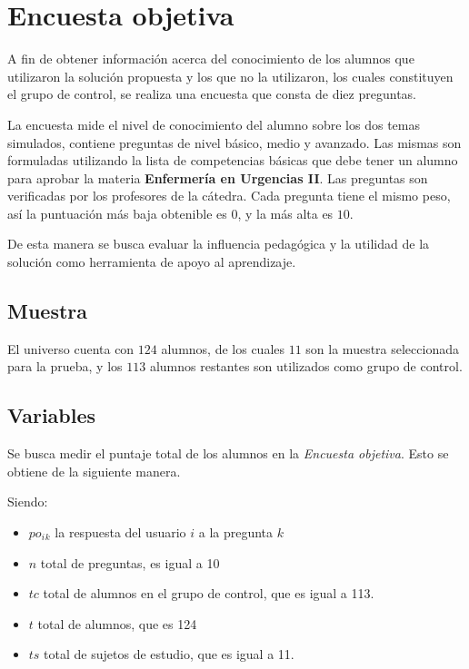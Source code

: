 
\section{Encuesta objetiva}
\label{sec:objetiva}

A fin de obtener información acerca del conocimiento de los alumnos que utilizaron 
la solución propuesta y los que no la utilizaron, los cuales constituyen el grupo 
de control, se realiza una encuesta que consta de diez preguntas.

La encuesta mide el nivel de conocimiento del alumno sobre los dos temas
simulados, contiene preguntas de nivel básico, medio y avanzado. Las mismas son
formuladas utilizando la lista de competencias básicas que debe tener un alumno
para aprobar la materia \textbf{Enfermería en Urgencias II}. Las preguntas son
verificadas  por los profesores de la cátedra. Cada pregunta tiene el mismo
peso, así la puntuación más baja obtenible es $0$, y la más alta es $10$.

De esta manera se busca evaluar la influencia pedagógica y la utilidad de la 
solución como herramienta de apoyo al aprendizaje.


\subsection{Muestra}

El universo cuenta con $124$ alumnos, de los cuales $11$ son la muestra seleccionada
para la prueba, y los $113$ alumnos restantes son utilizados
como grupo de control.

\subsection{Variables}

Se busca medir el puntaje total de los alumnos en la \emph{Encuesta objetiva}. Esto 
se obtiene de la siguiente manera.

Siendo:

\begin{itemize}
    \item $po_i{_k}$ la respuesta del usuario $i$ a la pregunta $k$
    \item $n$ total de preguntas, es igual a 10
    \item $tc$ total de alumnos en el grupo de control, que es igual a 113.
    \item $t$ total de alumnos, que es 124
    \item $ts$ total de sujetos de estudio, que es igual a 11.
\end{itemize}

